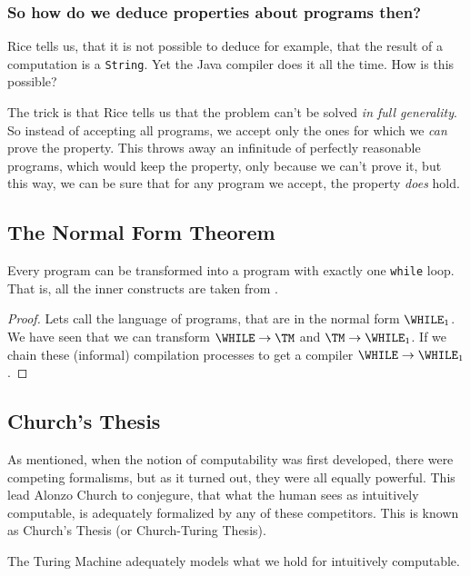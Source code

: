 \subsubsection{So how do we deduce properties about programs then?}
Rice tells us, that it is not possible to deduce for example, 
that the result of a computation is a {\tt String}. Yet the Java compiler 
does it all the time. How is this possible?

The trick is that Rice tells us that the problem can't be solved {\em in full
generality}. So instead of accepting all programs, we accept only the ones for
which we {\em can} prove the property. This throws away an infinitude of
perfectly reasonable programs, which would keep the property, only because we
can't prove it, but this way, we can be sure that for any program we accept,
the property {\em does} hold.

\subsection{The Normal Form Theorem}
\begin{theorem}
	Every \WHILE program can be transformed into a \WHILE program with exactly 
	one {\tt while} loop. That is, all the inner constructs are taken from \FOR.
\end{theorem}
\begin{proof}
	Lets call the language of \WHILE programs, that are in the normal form $\WHILE_1$.
	We have seen that we can transform $\WHILE \rightarrow \TM$ and 
	$\TM \rightarrow \WHILE_1$. If we chain these (informal) compilation processes to 
	get a compiler $\WHILE \rightarrow \WHILE_1$.
\end{proof}

\subsection{Church's Thesis}
As mentioned, when the notion of computability was first developed, there 
were competing formalisms, but as it turned out, they were all equally 
powerful. This lead Alonzo Church to conjegure, that what the human sees 
as intuitively computable, is adequately formalized by any of these 
competitors. This is known as Church's Thesis (or Church-Turing Thesis).

\begin{thesis}
	The Turing Machine adequately models what we hold for intuitively computable.
\end{thesis}

